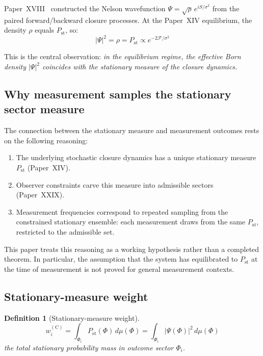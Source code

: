 \documentclass[12pt]{article}
\newtheorem{definition}[theorem]{Definition}
\newcommand{\Fcal}{\mathcal{F}}
\newcommand{\Pst}{P_{\mathrm{st}}}
\begin{document}
Paper~XVIII~\citep{SmartXVIII} constructed the Nelson wavefunction $\Psi = \sqrt{\rho}\, e^{iS/\sigma^2}$ from the paired forward/backward closure processes. At the Paper~XIV equilibrium, the density $\rho$ equals $\Pst$, so:
\begin{equation}\label{eq:born_connection}
    |\Psi|^2 = \rho = \Pst \propto e^{-2\Fcal/\sigma^2}
\end{equation}

This is the central observation: \textit{in the equilibrium regime, the effective Born density $|\Psi|^2$ coincides with the stationary measure of the closure dynamics.}

\subsection{Why measurement samples the stationary sector measure}

The connection between the stationary measure and measurement outcomes rests on the following reasoning:
\begin{enumerate}
    \item The underlying stochastic closure dynamics has a unique stationary measure $\Pst$ (Paper~XIV).
    \item Observer constraints carve this measure into admissible sectors (Paper~XXIX).
    \item Measurement frequencies correspond to repeated sampling from the constrained stationary ensemble: each measurement draws from the same $\Pst$, restricted to the admissible set.
\end{enumerate}
This paper treats this reasoning as a working hypothesis rather than a completed theorem. In particular, the assumption that the system has equilibrated to $\Pst$ at the time of measurement is not proved for general measurement contexts.

\subsection{Stationary-measure weight}

\begin{definition}[Stationary-measure weight]\label{def:stationary_weight}
\begin{equation}\label{eq:stationary_weight}
    w_i^{(\mathrm{C})} = \int_{\Phi_i} \Pst(\Phi)\, d\mu(\Phi) = \int_{\Phi_i} |\Psi(\Phi)|^2\, d\mu(\Phi)
\end{equation}
the total stationary probability mass in outcome sector $\Phi_i$.
\end{definition}
\end{document}
